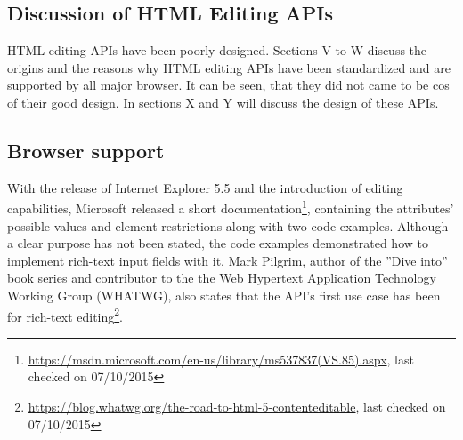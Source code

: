 \subsection{Discussion of HTML Editing APIs}

HTML editing APIs have been poorly designed. Sections V to W discuss the origins and the reasons why HTML editing APIs have been standardized and are supported by all major browser. It can be seen, that they did not came to be cos of their good design. In sections X and Y will discuss the design of these APIs.

\subsection{Browser support}

With the release of Internet Explorer 5.5 and the introduction of editing capabilities, Microsoft released a short documentation\footnote{\url{https://msdn.microsoft.com/en-us/library/ms537837(VS.85).aspx}, last checked on 07/10/2015}, containing the attributes' possible values and element restrictions along with two code examples. Although a clear purpose has not been stated, the code examples demonstrated how to implement rich-text input fields with it. Mark Pilgrim, author of the ''Dive into'' book series and contributor to the the Web Hypertext Application Technology Working Group (WHATWG), also states that the API's first use case has been for rich-text editing\footnote{\url{https://blog.whatwg.org/the-road-to-html-5-contenteditable}, last checked on 07/10/2015}. 



